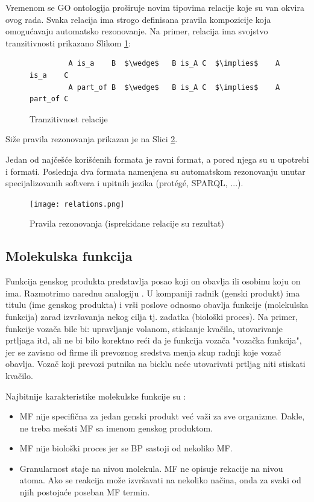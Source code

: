 Vremenom se GO ontologija proširuje novim tipovima relacije koje su van okvira ovog rada.
Svaka relacija ima strogo definisana pravila kompozicije koja omogućavaju
automatsko rezonovanje. Na primer, relacija  ima svojstvo
tranzitivnosti \parencite{is_a} prikazano Slikom \ref{fig:is_a}:
\lstset{
  basicstyle=\ttfamily, mathescape,
  numbers=none
}

\begin{figure}[h!]
  \centering
\begin{lstlisting}
         A is_a    B  $\wedge$   B is_A C  $\implies$    A is_a    C           
         A part_of B  $\wedge$   B is_A C  $\implies$    A part_of C
\end{lstlisting}
\caption{Tranzitivnost relacije }
  \label{fig:is_a}
\end{figure}


Siže pravila rezonovanja prikazan je na Slici \ref{fig:relations}.

Jedan od najčešće korišćenih formata je  ravni  format, a pored njega
su u upotrebi  i  formati.  Poslednja dva formata
namenjena su automatskom rezonovanju unutar specijalizovanih softvera i upitnih
jezika (protégé, SPARQL, ...).

\begin{figure}[h!]
  \centering
  \texttt{[image: relations.png]}
  \caption{Pravila rezonovanja (isprekidane relacije su rezultat)}
  \label{fig:relations}
\end{figure}


\subsection{Molekulska funkcija}
\label{MF}

Funkcija genskog produkta predstavlja posao koji on obavlja ili osobinu koju on ima.
Razmotrimo narednu analogiju \parencite{go_mf}.  U kompaniji radnik (genski produkt) ima titulu
(ime genskog produkta) i vrši poslove odnosno obavlja funkcije (molekulska
funkcija) zarad izvršavanja nekog cilja tj. zadatka (biološki proces). Na
primer, funkcije vozača bile bi: upravljanje volanom, stiskanje kvačila,
utovarivanje prtljaga itd, ali ne bi bilo korektno reći da je funkcija vozača
"vozačka funkcija", jer se zavisno od firme ili prevoznog sredstva menja skup
radnji koje vozač obavlja.  Vozač koji prevozi putnika na bicklu neće
utovarivati prtljag niti stiskati kvačilo.

Najbitnije karakteristike molekulske funkcije su \parencite{go_mf}:
\begin{itemize}
  \item MF nije specifična za jedan genski produkt već važi za sve organizme. Dakle, ne treba mešati MF sa imenom genskog produktom.
  \item MF nije biološki proces jer se BP sastoji od nekoliko MF.
  \item Granularnost staje na nivou molekula. MF ne opisuje rekacije na nivou
    atoma. Ako se reakcija može izvršavati na nekoliko načina, onda za svaki od njih
    postojaće poseban MF termin.
\end{itemize}

